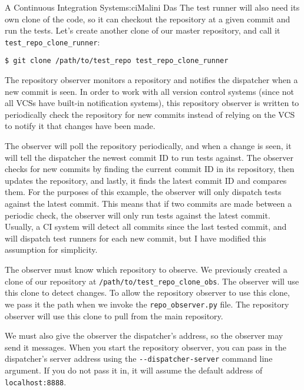 \begin{aosachapter}{A Continuous Integration System}{s:ci}{Malini Das}
The test runner will also need its own clone of the code, so it can
checkout the repository at a given commit and run the tests. Let's
create another clone of our master repository, and call it
\texttt{test\_repo\_clone\_runner}:

\begin{verbatim}
$ git clone /path/to/test_repo test_repo_clone_runner
\end{verbatim}

\label{the-components}

\label{the-repository-observer-repoux5fobserver.py}

The repository observer monitors a repository and notifies the
dispatcher when a new commit is seen. In order to work with all version
control systems (since not all VCSs have built-in notification systems),
this repository observer is written to periodically check the repository
for new commits instead of relying on the VCS to notify it that changes
have been made.

The observer will poll the repository periodically, and when a change is
seen, it will tell the dispatcher the newest commit ID to run tests
against. The observer checks for new commits by finding the current
commit ID in its repository, then updates the repository, and lastly, it
finds the latest commit ID and compares them. For the purposes of this
example, the observer will only dispatch tests against the latest
commit. This means that if two commits are made between a periodic
check, the observer will only run tests against the latest commit.
Usually, a CI system will detect all commits since the last tested
commit, and will dispatch test runners for each new commit, but I have
modified this assumption for simplicity.

The observer must know which repository to observe. We previously
created a clone of our repository at
\texttt{/path/to/test\_repo\_clone\_obs}. The observer will use this
clone to detect changes. To allow the repository observer to use this
clone, we pass it the path when we invoke the \texttt{repo\_observer.py}
file. The repository observer will use this clone to pull from the main
repository.

We must also give the observer the dispatcher's address, so the observer
may send it messages. When you start the repository observer, you can
pass in the dispatcher's server address using the
\texttt{-{}-dispatcher-server} command line argument. If you do not pass
it in, it will assume the default address of \texttt{localhost:8888}.


\end{aosachapter}

